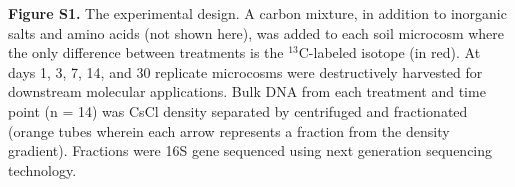 \textbf{Figure S1.} The experimental design.  A carbon mixture, in addition to inorganic salts and amino acids (not shown here), was added to each soil microcosm where the only difference between treatments is the $^{13}$C-labeled isotope (in red). At days 1, 3, 7, 14, and 30 replicate microcosms were destructively harvested for downstream molecular applications. Bulk DNA from each treatment and time point (n = 14) was CsCl density separated by centrifuged and fractionated (orange tubes wherein each arrow represents a fraction from the density gradient). Fractions were 16S gene sequenced using next generation sequencing technology.
